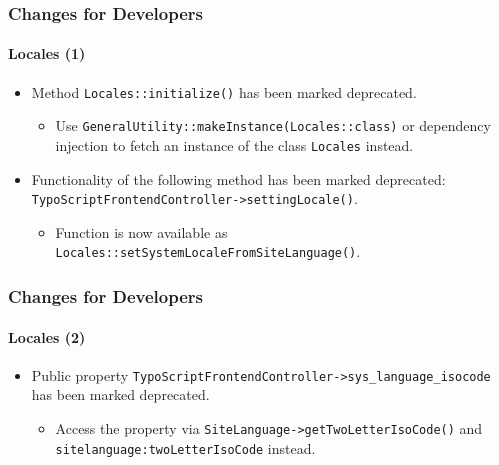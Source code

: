 \begin{frame}[fragile]
	\frametitle{Changes for Developers}
	\framesubtitle{Locales (1)}

	\begin{itemize}
		\item Method \texttt{Locales::initialize()} has been marked deprecated.

			\begin{itemize}\smaller
				\item[\ding{228}] Use \texttt{GeneralUtility::makeInstance(Locales::class)} or
				dependency injection to fetch an instance of the class \texttt{Locales} instead.
			\end{itemize}\normalsize

		\item Functionality of the following method has been marked deprecated:\newline
			\texttt{TypoScriptFrontendController->settingLocale()}.

			\begin{itemize}\smaller
				\item[\ding{228}] Function is now available as
				{\fontsize{8}{8} \selectfont \texttt{Locales::setSystemLocaleFromSiteLanguage()}.}
			\end{itemize}\normalsize

	\end{itemize}

\end{frame}


\begin{frame}[fragile]
	\frametitle{Changes for Developers}
	\framesubtitle{Locales (2)}

	\begin{itemize}
		\item Public property \texttt{TypoScriptFrontendController->sys\_language\_isocode}
			has been marked deprecated.

			\begin{itemize}\smaller
				\item[\ding{228}] Access the property via \texttt{SiteLanguage->getTwoLetterIsoCode()}
				and \texttt{sitelanguage:twoLetterIsoCode} instead.
			\end{itemize}\normalsize

	\end{itemize}

\end{frame}

